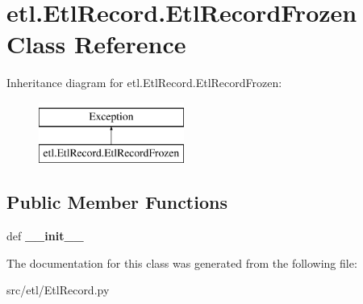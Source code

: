 \hypertarget{classetl_1_1EtlRecord_1_1EtlRecordFrozen}{\section{etl.\-Etl\-Record.\-Etl\-Record\-Frozen Class Reference}
\label{classetl_1_1EtlRecord_1_1EtlRecordFrozen}
}
Inheritance diagram for etl.\-Etl\-Record.\-Etl\-Record\-Frozen\-:\begin{figure}[H]
\begin{center}
\leavevmode
\includegraphics[height=2.000000cm]{classetl_1_1EtlRecord_1_1EtlRecordFrozen}
\end{center}
\end{figure}
\subsection*{Public Member Functions}
\begin{DoxyCompactItemize}
\item 
\hypertarget{classetl_1_1EtlRecord_1_1EtlRecordFrozen_aa79c626e5b00509f1227f6d9cbcc78c7}{def {\bfseries \-\_\-\-\_\-init\-\_\-\-\_\-}}\label{classetl_1_1EtlRecord_1_1EtlRecordFrozen_aa79c626e5b00509f1227f6d9cbcc78c7}

\end{DoxyCompactItemize}


The documentation for this class was generated from the following file\-:\begin{DoxyCompactItemize}
\item 
src/etl/Etl\-Record.\-py\end{DoxyCompactItemize}
